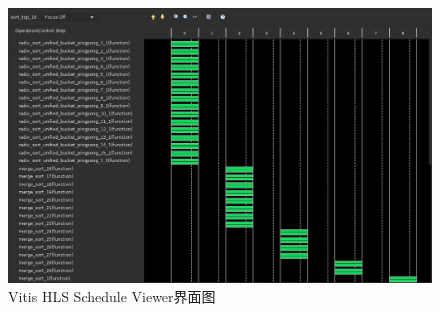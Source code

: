 \begin{figure}[htbp]
    \centering
    \includegraphics[width=\linewidth]{figures/schedule_viewer.jpeg}
    \caption{Vitis HLS Schedule Viewer界面图}
    \label{fig:schedule_viewer}
\end{figure}


